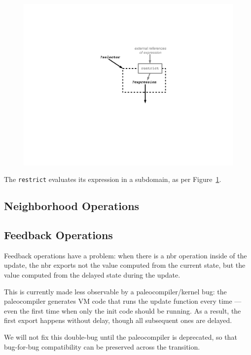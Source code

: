 \documentclass{article}
\begin{document}
\begin{figure}
\centering
\includegraphics{figures/restriction.pdf}
\caption{}
\label{f:restrict}
\end{figure}

The {\tt restrict} evaluates its expression in a subdomain, as per
Figure~\ref{f:restrict}.

\subsection{Neighborhood Operations} 

\subsection{Feedback Operations}

Feedback operations have a problem: when there is a nbr operation inside
of the update, the nbr exports not the value computed from the current state,
but the value computed from the delayed state during the update.

This is currently made less observable by a paleocompiler/kernel bug: the
paleocompiler generates VM code that runs the update function every time ---
even the first time when only the init code should be running.  As a result, 
the first export happens without delay, though all subsequent ones are delayed.

We will not fix this double-bug until the paleocompiler is deprecated, so that
bug-for-bug compatibility can be preserved across the transition.
\end{document}

